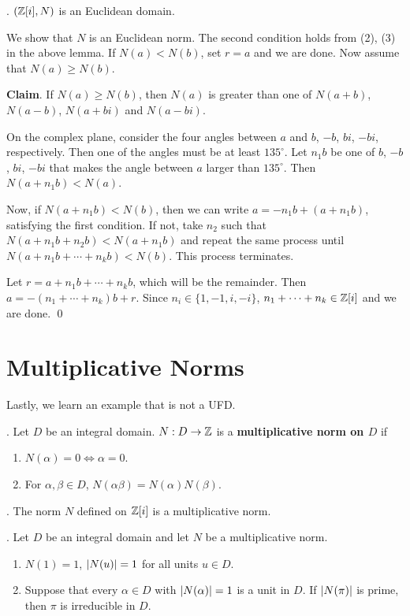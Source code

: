 \thm. \((\mathbb{Z}[i], N)\) is an Euclidean domain.

\pf We show that \(N\) is an Euclidean norm. The second condition holds from (2), (3) in the above lemma. If \(N(a) < N(b)\), set \(r = a\) and we are done. Now assume that \(N(a) \geq N(b)\).

\quad \textbf{Claim}. If \(N(a) \geq N(b)\), then \(N(a)\) is greater than one of \(N(a+b)\), \(N(a-b)\), \(N(a+bi)\) and \(N(a-bi)\).

\quad \pf On the complex plane, consider the four angles between \(a\) and \(b\), \(-b\), \(bi\), \(-bi\), respectively. Then one of the angles must be at least \(135^\circ\). Let \(n_1b\) be one of \(b\), \(-b\), \(bi\), \(-bi\) that makes the angle between \(a\) larger than \(135^\circ\). Then \(N(a + n_1 b) < N(a)\).

Now, if \(N(a + n_1 b) < N(b)\), then we can write \(a = -n_1b + (a + n_1b)\), satisfying the first condition. If not, take \(n_2\) such that \(N(a + n_1b + n_2b) < N(a + n_1b)\) and repeat the same process until \(N(a + n_1 b + \cdots + n_k b) < N(b)\). This process terminates.

Let \(r = a + n_1 b + \cdots + n_k b\), which will be the remainder. Then \(a = -(n_1 + \cdots + n_k)b + r\). Since \(n_i \in \{1, -1, i, -i\}\), \(n_1 + \cdots + n_k \in \mathbb{Z}[i]\) and we are done. \qed

\section*{Multiplicative Norms}

Lastly, we learn an example that is not a UFD.

.  Let \(D\) be an integral domain. \(N : D \rightarrow \mathbb{Z}\) is a \textbf{multiplicative norm on \(D\)} if
\begin{enumerate}
    \item \(N(\alpha) = 0 \iff \alpha = 0\).
    \item For \(\alpha, \beta \in D\), \(N(\alpha\beta) = N(\alpha)N(\beta)\).
\end{enumerate}

\ex. The norm \(N\) defined on \(\mathbb{Z}[i]\) is a multiplicative norm.

\thm. Let \(D\) be an integral domain and let \(N\) be a multiplicative norm.
\begin{enumerate}
    \item \(N(1) = 1\), \(\left| N(u) \right| = 1\) for all units \(u \in D\).
    \item Suppose that every \(\alpha \in D\) with \(\left| N(\alpha) \right| = 1\) is a unit in \(D\). If \(\left| N(\pi) \right|\) is prime, then \(\pi\) is irreducible in \(D\).
\end{enumerate}

